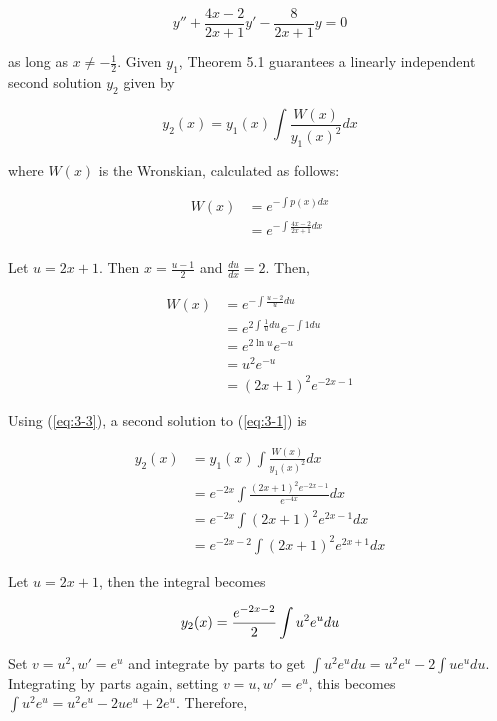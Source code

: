 \documentclass{article}
\begin{document}
\begin{equation} \label{eq:3-2}
    y'' + \frac{4x - 2}{2x + 1}y' - \frac{8}{2x + 1}y = 0
\end{equation}

as long as $x \neq -\frac{1}{2}$. Given $y_1$, Theorem 5.1 guarantees a linearly independent second solution $y_2$ given by

\begin{equation} \label{eq:3-3}
    y_2(x) = y_1(x)\int \frac{W(x)}{y_1(x)^2} dx
\end{equation}

where $W(x)$ is the Wronskian, calculated as follows:

\begin{align*}
    W(x) &= e^{-\int p(x) dx}\\
    &= e^{-\int \frac{4x - 2}{2x + 1} dx}\\
\end{align*}

Let $u = 2x + 1$. Then $x = \frac{u - 1}{2}$ and $\frac{du}{dx} = 2$. Then,

\begin{align*}
    W(x) &= e^{-\int \frac{u - 2}{u}du}\\
    &= e^{2\int \frac{1}{u}du}e^{-\int 1 du}\\
    &= e^{2\ln u}e^{-u}\\
    &= u^2e^{-u}\\
    &= (2x + 1)^2e^{-2x - 1}
\end{align*}

Using (\ref{eq:3-3}), a second solution to (\ref{eq:3-1}) is

\begin{align*}
    y_2(x) &= y_1(x)\int\frac{W(x)}{y_1(x)^2} dx\\
    &= e^{-2x}\int \frac{(2x + 1)^2e^{-2x - 1}}{e^{-4x}} dx\\
    &= e^{-2x}\int (2x + 1)^2e^{2x - 1} dx\\
    &= e^{-2x - 2}\int(2x + 1)^2e^{2x + 1} dx
\end{align*}

Let $u = 2x + 1$, then the integral becomes

\begin{equation*}
    y_2(x) = \frac{e^{-2x - 2}}{2} \int u^2e^u du\\
\end{equation*}

Set $v = u^2, w' = e^u$ and integrate by parts to get $\int u^2e^u du = u^2e^u - 2\int ue^u du$. Integrating by parts again, setting $v = u, w' = e^u$, this
becomes $\int u^2e^u = u^2e^u - 2ue^u + 2e^u$. Therefore,
\end{document}
